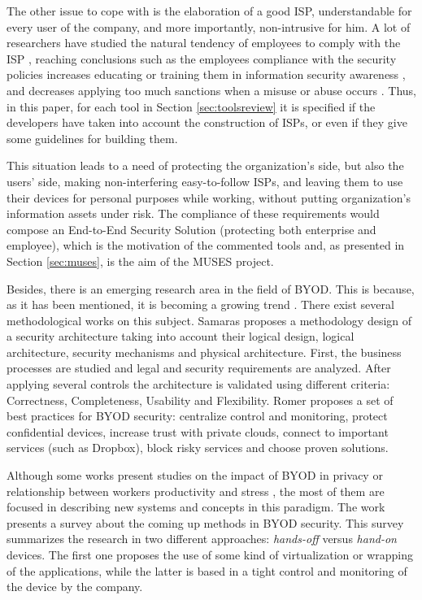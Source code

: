 The other issue to cope with is the elaboration of a good ISP, understandable for every user of the company, and more importantly, non-intrusive for him. A lot of researchers have studied the natural tendency of employees to comply with the ISP \cite{SecPolComp10,SecPolComp12,SecPolComp14}, reaching conclusions such as the employees compliance with the security policies increases educating or training them in information security awareness \cite{SecPolComp09}, and decreases applying too much sanctions when a misuse or abuse occurs \cite{SecPolPenalty09}. Thus, in this paper, for each tool in Section \ref{sec:toolsreview} it is specified if the developers have taken into account the construction of ISPs, or even if they give some guidelines for building them. 

This situation leads to a need of protecting the organization's side, but also the users' side, making non-interfering easy-to-follow ISPs, and leaving them to use their devices for personal purposes while working, without putting organization's information assets under risk. The compliance of these requirements would compose an End-to-End Security Solution (protecting both enterprise and employee), which is the motivation of the commented tools and, as presented in Section \ref{sec:muses}, is the aim of the MUSES project.

Besides, there is an emerging research area in the field of BYOD. This is because, as it has been mentioned, it is becoming a growing trend \cite{Garba15organisational}. There exist several methodological works on this subject. Samaras \cite{Samaras13SaaS} proposes a methodology design of a security architecture taking into account their logical design, logical architecture, security mechanisms and physical architecture. First, the business processes are studied and legal and security requirements are analyzed. After applying several controls the architecture is validated using different criteria: Correctness, Completeness, Usability and Flexibility. Romer \cite{Romer14BestPractices} proposes a set of best practices for BYOD security: centralize control and monitoring, protect confidential devices, increase trust with private clouds, connect to important services (such as Dropbox), block risky services and choose proven solutions.

Although some works present studies on the impact of BYOD in privacy \cite{Miller12Privacy} or relationship between workers productivity and stress \cite{Haejung12Door}, the most of them are focused in describing new systems and concepts in this paradigm. The work \cite{Scarfo12survey} presents a survey about the coming up methods in BYOD security. This survey summarizes the research in two different approaches: {\em hands-off} versus {\em hand-on} devices. The first one proposes the use of some kind of virtualization or wrapping of the applications, while the latter is based in a tight control and monitoring of the device by the company.

